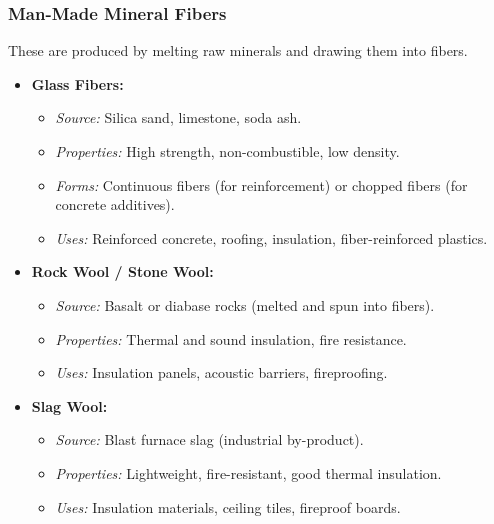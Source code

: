 \documentclass[12pt,a4paper]{article}
\begin{document}
\subsubsection{Man-Made Mineral Fibers}
These are produced by melting raw minerals and drawing them into fibers.
\begin{itemize}
    \item \textbf{Glass Fibers:}
    \begin{itemize}
        \item \textit{Source:} Silica sand, limestone, soda ash.
        \item \textit{Properties:} High strength, non-combustible, low density.
        \item \textit{Forms:} Continuous fibers (for reinforcement) or chopped fibers (for concrete additives).
        \item \textit{Uses:} Reinforced concrete, roofing, insulation, fiber-reinforced plastics.
    \end{itemize}
    \item \textbf{Rock Wool / Stone Wool:}
    \begin{itemize}
        \item \textit{Source:} Basalt or diabase rocks (melted and spun into fibers).
        \item \textit{Properties:} Thermal and sound insulation, fire resistance.
        \item \textit{Uses:} Insulation panels, acoustic barriers, fireproofing.
    \end{itemize}
    \item \textbf{Slag Wool:}
    \begin{itemize}
        \item \textit{Source:} Blast furnace slag (industrial by-product).
        \item \textit{Properties:} Lightweight, fire-resistant, good thermal insulation.
        \item \textit{Uses:} Insulation materials, ceiling tiles, fireproof boards.
    \end{itemize}
\end{itemize}
\end{document}
